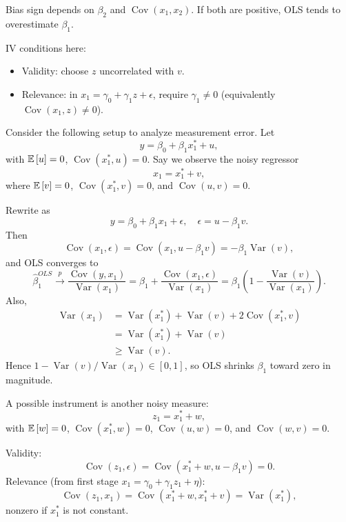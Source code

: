 \begin{remark}
	Bias sign depends on $\beta_2$ and $\operatorname{Cov}(x_1,x_2)$. If both are positive, OLS tends to overestimate $\beta_1$.

	IV conditions here:
	\begin{itemize}
		\item Validity: choose $z$ uncorrelated with $v$.
		\item Relevance: in $x_1 = \gamma_0 + \gamma_1 z + \epsilon$, require $\gamma_1\ne 0$ (equivalently $\operatorname{Cov}(x_1,z)\ne 0$).
	\end{itemize}
\end{remark}

Consider the following setup to analyze measurement error.
	Let \[
		y = \beta_0 + \beta_1 x_1^* + u
	,\]
	with $\mathbb{E}\left[u\right]=0$, $\operatorname{Cov}(x_1^*,u)=0$. Say we observe the noisy regressor \[
		x_1 = x_1^* + v
	,\]
	where $\mathbb{E}\left[v\right]=0$, $\operatorname{Cov}(x_1^*,v)=0$, and $\operatorname{Cov}(u,v)=0$.

\begin{proposition}
	Rewrite as \[
		y = \beta_0 + \beta_1 x_1 + \epsilon, \quad \epsilon = u-\beta_1 v
	.\]
	Then \[
		\operatorname{Cov}(x_1,\epsilon)=\operatorname{Cov}(x_1,u-\beta_1 v)=-\beta_1\operatorname{Var}(v)
	,\]
	and OLS converges to \[
		\hat{\beta}_1^{OLS} \xrightarrow{p}  \frac{\operatorname{Cov}\left(y,x_1\right)}{\operatorname{Var}\left(x_1\right)} = \beta_1 + \frac{\operatorname{Cov}(x_1,\epsilon)}{\operatorname{Var}(x_1)} = \beta_1\left(1-\frac{\operatorname{Var}(v)}{\operatorname{Var}(x_1)}\right)
	.\]
	Also,
	\begin{align*}
		\operatorname{Var}(x_1)
		&= \operatorname{Var}(x_1^*) + \operatorname{Var}(v) + 2\operatorname{Cov}(x_1^*,v) \\
		&= \operatorname{Var}(x_1^*) + \operatorname{Var}(v) \\
		&\ge \operatorname{Var}(v)
	.\end{align*}
	Hence $1-\operatorname{Var}(v)/\operatorname{Var}(x_1)\in[0,1]$, so OLS shrinks $\beta_1$ toward zero in magnitude.
\end{proposition}

\begin{remark}
	A possible instrument is another noisy measure: \[
		z_1 = x_1^* + w
	,\]
	with $\mathbb{E}\left[w\right]=0$, $\operatorname{Cov}(x_1^*,w)=0$, $\operatorname{Cov}(u,w)=0$, and $\operatorname{Cov}(w,v)=0$.

	Validity: \[
		\operatorname{Cov}(z_1,\epsilon)=\operatorname{Cov}(x_1^*+w, u-\beta_1 v)=0
	.\]
	Relevance (from first stage $x_1=\gamma_0+\gamma_1 z_1+\eta$): \[
		\operatorname{Cov}(z_1,x_1)=\operatorname{Cov}(x_1^*+w, x_1^*+v)=\operatorname{Var}(x_1^*)
	,\]
	nonzero if $x_1^*$ is not constant.
\end{remark}

